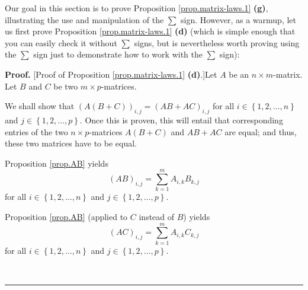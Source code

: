 \documentclass[numbers=enddot,12pt,final,onecolumn,notitlepage]{scrartcl}%
\theoremstyle{definition}
\newenvironment{proof}[1][Proof]{\noindent\textbf{#1.} }{\ \rule{0.5em}{0.5em}}
\let\sumnonlimits\sum
\renewcommand{\sum}{\sumnonlimits\limits}
\begin{document}
Our goal in this section is to prove Proposition \ref{prop.matrix-laws.1}
\textbf{(g)}, illustrating the use and manipulation of the $\sum$ sign.
However, as a warmup, let us first prove Proposition \ref{prop.matrix-laws.1}
\textbf{(d)} (which is simple enough that you can easily check it without
$\sum$ signs, but is nevertheless worth proving using the $\sum$ sign just to
demonstrate how to work with the $\sum$ sign):

\begin{proof}
[Proof of Proposition \ref{prop.matrix-laws.1} \textbf{(d)}.]Let $A$ be an
$n\times m$-matrix. Let $B$ and $C$ be two $m\times p$-matrices.

We shall show that $\left(  A\left(  B+C\right)  \right)  _{i,j}=\left(
AB+AC\right)  _{i,j}$ for all $i\in\left\{  1,2,\ldots,n\right\}  $ and
$j\in\left\{  1,2,\ldots,p\right\}  $. Once this is proven, this will entail
that corresponding entries of the two $n\times p$-matrices $A\left(
B+C\right)  $ and $AB+AC$ are equal; and thus, these two matrices have to be equal.

Proposition \ref{prop.AB} yields%
\begin{equation}
\left(  AB\right)  _{i,j}=\sum_{k=1}^{m}A_{i,k}B_{k,j}
\label{pf.prop.matrix-laws.1.d.1}%
\end{equation}
for all $i\in\left\{  1,2,\ldots,n\right\}  $ and $j\in\left\{  1,2,\ldots
,p\right\}  $.

Proposition \ref{prop.AB} (applied to $C$ instead of $B$) yields%
\begin{equation}
\left(  AC\right)  _{i,j}=\sum_{k=1}^{m}A_{i,k}C_{k,j}
\label{pf.prop.matrix-laws.1.d.2}%
\end{equation}
for all $i\in\left\{  1,2,\ldots,n\right\}  $ and $j\in\left\{  1,2,\ldots
,p\right\}  $.


\end{proof}
\end{document}
